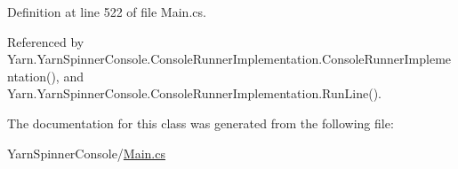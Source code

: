 Definition at line 522 of file Main.\-cs.



Referenced by Yarn.\-Yarn\-Spinner\-Console.\-Console\-Runner\-Implementation.\-Console\-Runner\-Implementation(), and Yarn.\-Yarn\-Spinner\-Console.\-Console\-Runner\-Implementation.\-Run\-Line().



The documentation for this class was generated from the following file\-:\begin{DoxyCompactItemize}
\item 
Yarn\-Spinner\-Console/\hyperlink{a00325}{Main.\-cs}\end{DoxyCompactItemize}
